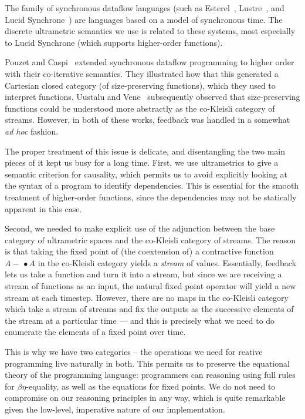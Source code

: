 \documentclass[preprint]{sigplanconf}
\newcommand{\lollishrink}{-\!\!\!\,\bullet}
\begin{document}
The family of synchronous dataflow languages (such as
Esterel~\cite{esterel}, Lustre~\cite{lustre}, and Lucid
Synchrone~\cite{synchrone}) are languages based on a model of
synchronous time. The discrete ultrametric semantics we use is related
to these systems, most especially to Lucid Synchrone (which supports
higher-order functions).

Pouzet and Caspi~\cite{coiterative} extended synchronous dataflow
programming to higher order with their co-iterative semantics. They
illustrated how that this generated a Cartesian closed category (of
size-preserving functions), which they used to interpret
functions. Uustalu and Vene~\cite{essence-dataflow} subsequently
observed that size-preserving functions could be understood more
abstractly as the co-Kleisli category of streams. However, in both of
these works, feedback was handled in a somewhat \emph{ad hoc} fashion.

The proper treatment of this issue is delicate, and disentangling the
two main pieces of it kept us busy for a long time. First, we use
ultrametrics to give a semantic criterion for causality, which permits
us to avoid explicitly looking at the syntax of a program to identify
dependencies. This is essential for the smooth treatment of
higher-order functions, since the dependencies may not be statically
apparent in this case.

Second, we needed to make explicit use of the adjunction between the
base category of ultrametric spaces and the co-Kleisli category of
streams. The reason is that taking the fixed point of (the coextension
of) a contractive function $A \lollishrink A$ in the co-Kleisli
category yields a \emph{stream} of values. Essentially, feedback lets
us take a function and turn it into a stream, but since we are
receiving a stream of functions as an input, the natural fixed point
operator will yield a new stream at each timestep.  However, there are
no maps in the co-Kleisli category which take a stream of streams and
fix the outputs as the successive elements of the stream at a
particular time --- and this is precisely what we need to do enumerate
the elements of a fixed point over time.

This is why we have two categories -- the operations we need for
reative programming live naturally in both. This permits us to
preserve the equational theory of the programming language:
programmers can reasoning using full rules for $\beta\eta$-equality,
as well as the equations for fixed points. We do not need to
compromise on our reasoning principles in any way, which is quite
remarkable given the low-level, imperative nature of our
implementation.
\end{document}
